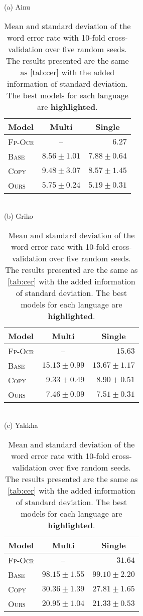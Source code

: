 \begin{table}[tb]
    \centering
    \small
    (a) Ainu\\
    \begin{tabular}{l|r@{\ \ \ }r}
    \toprule
        Model & \multicolumn{1}{c}{Multi} & \multicolumn{1}{c}{Single} \\
        \midrule
        \textsc{Fp-Ocr} & \multicolumn{1}{c}{--} & $6.27$ \\
        \textsc{Base} & $8.56 \pm 1.01$ & $7.88 \pm 0.64$   \\
        \textsc{Copy} & $9.48 \pm 3.07$ & $8.57 \pm 1.45$ \\
        \textsc{Ours} & $5.75 \pm 0.24$ & $\boldsymbol{5.19} \pm 0.31$ \\
    \bottomrule
    \end{tabular}\\
    \vspace{1em}
    (b) Griko\\
    \begin{tabular}{l|r@{\ \ \ }r}
    \toprule
        Model & \multicolumn{1}{c}{Multi} & \multicolumn{1}{c}{Single} \\
        \midrule
        \textsc{Fp-Ocr} & \multicolumn{1}{c}{--} & $15.63$ \\
        \textsc{Base} & $15.13 \pm 0.99$ & $13.67 \pm 1.17$ \\
        \textsc{Copy} & $9.33 \pm 0.49$ & $8.90 \pm 0.51$ \\
        \textsc{Ours} & $\boldsymbol{7.46} \pm 0.09$ & $7.51 \pm 0.31$ \\
    \bottomrule
    \end{tabular}\\
    \vspace{1em}
    (c) Yakkha\\
    \begin{tabular}{l|r@{\ \ \ }r}
    \toprule
        Model & \multicolumn{1}{c}{Multi} & \multicolumn{1}{c}{Single} \\
        \midrule
        \textsc{Fp-Ocr} & \multicolumn{1}{c}{--} & $31.64$ \\
        \textsc{Base} & $98.15 \pm 1.55$ & $99.10 \pm 2.20$  \\
        \textsc{Copy} & $30.36 \pm 1.39$ & $27.81 \pm 1.65$ \\
        \textsc{Ours} & $\boldsymbol{20.95} \pm 1.04$ & $21.33 \pm 0.53$ \\
    \bottomrule
    \end{tabular}
    \caption{Mean and standard deviation of the word error rate with 10-fold cross-validation over five random seeds. The results presented are the same as \autoref{tab:cer} with the added information of standard deviation. The best models for each language are \textbf{highlighted}.}
    \label{tab:stddev_wer}
    \vspace{1em}
\end{table}
